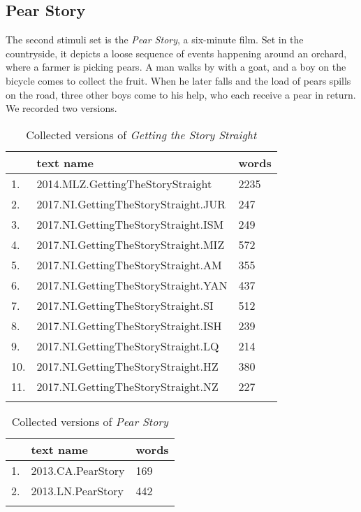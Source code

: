 \documentclass[output=paper
,modfonts
,nonflat]{langsci/langscibook}
\begin{document}
\subsection{Pear Story \citep{Chafe1980}}\label{Methodology:Pear}
The second stimuli set is the \emph{Pear Story}, a six-minute film. Set in the countryside, it depicts a loose sequence of events happening around an orchard, where a farmer is picking pears. A man walks by with a goat, and a boy on the bicycle comes to collect the fruit. When he later falls and the load of pears spills on the road, three other boys come to his help, who each receive a pear in return. We recorded two versions.

\begin{table}[p]
\caption{Collected versions of \emph{Getting the Story Straight} \citep{SanRoqueEtAl2012}}
\label{tab:UsedTextsGTSS}
 \begin{tabularx}{.7\textwidth}{Xll} 
  \lsptoprule
& text name & words \\
  \midrule
1. & 2014.MLZ.GettingTheStoryStraight & 2235 \\
2. & 2017.NI.GettingTheStoryStraight.JUR & 247 \\
3. & 2017.NI.GettingTheStoryStraight.ISM & 249 \\
4. & 2017.NI.GettingTheStoryStraight.MIZ & 572 \\
5. & 2017.NI.GettingTheStoryStraight.AM & 355 \\
6. & 2017.NI.GettingTheStoryStraight.YAN & 437 \\
7. & 2017.NI.GettingTheStoryStraight.SI & 512 \\
8. & 2017.NI.GettingTheStoryStraight.ISH & 239 \\
9. & 2017.NI.GettingTheStoryStraight.LQ & 214 \\
10. & 2017.NI.GettingTheStoryStraight.HZ & 380 \\
11. & 2017.NI.GettingTheStoryStraight.NZ & 227 \\

  \lspbottomrule
 \end{tabularx}
\end{table}

\begin{table}[p]
\caption{Collected versions of \emph{Pear Story} \citep{Chafe1980}}
\label{tab:UsedTextsPear}
 \begin{tabularx}{.7\textwidth}{Xll} 
  \lsptoprule
& text name & words \\
  \midrule
1. & 2013.CA.PearStory & 169 \\
2. & 2013.LN.PearStory & 442 \\
  \lspbottomrule
 \end{tabularx}
\end{table}
\end{document}
